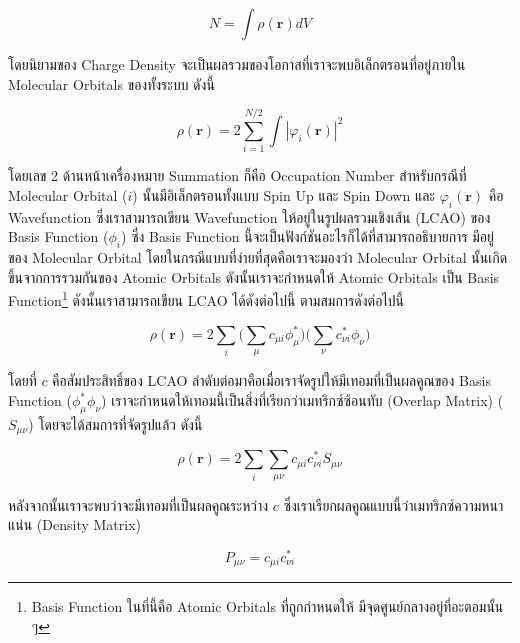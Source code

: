 \begin{equation}
    N = \int \rho (\mathbf{r}) dV
\end{equation}

โดยนิยามของ Charge Density จะเป็นผลรวมของโอกาสที่เราจะพบอิเล็กตรอนที่อยู่ภายใน Molecular Orbitals ของทั้งระบบ ดังนี้

\begin{equation}\label{eq:charge_density}
    \rho (\mathbf{r}) = 2 \sum^{N/2}_{i=1} \int |\varphi_{i}(\mathbf{r})|^{2}
\end{equation}

\noindent โดยเลข 2 ด้านหน้าเครื่องหมาย Summation ก็คือ Occupation Number สำหรับกรณีที่ Molecular Orbital ($i$) 
นั้นมีอิเล็กตรอนทั้งแบบ Spin Up และ Spin Down และ $\varphi_{i}(\mathbf{r})$ คือ Wavefunction ซึ่งเราสามารถเขียน Wavefunction 
ให้อยู่ในรูปผลรวมเชิงเส้น (LCAO) ของ Basis Function ($\phi_{i}$) ซึ่ง Basis Function นี้จะเป็นฟังก์ชันอะไรก็ได้ที่สามารถอธิบายการ%
มีอยู่ของ Molecular Orbital โดยในกรณีแบบที่ง่ายที่สุดคือเราจะมองว่า Molecular Orbital นั้นเกิดขึ้นจากการรวมกันของ Atomic Orbitals 
ดังนั้นเราจะกำหนดให้ Atomic Orbitals เป็น Basis Function\footnote{Basis Function ในที่นี้คือ Atomic Orbitals ที่ถูกกำหนดให้%
มีจุดศูนย์กลางอยู่ที่อะตอมนั้น ๆ} ดังนั้นเราสามารถเขียน LCAO ได้ดังต่อไปนี้ 
ตามสมการดังต่อไปนี้

\begin{equation}
    \rho (\mathbf{r}) = 2 \sum_{i} \big( \sum_{\mu} c_{\mu i} \phi_{\mu}^{*} \big) 
    \big( \sum_{\nu} c^{*}_{\nu i}  \phi_{\nu} \big)
\end{equation}

\noindent โดยที่ $c$ คือสัมประสิทธิ์ของ LCAO ลำดับต่อมาคือเมื่อเราจัดรูปให้มีเทอมที่เป็นผลคูณของ Basis Function ($\phi_{\mu}^{*} 
\phi_{\nu}$) เราจะกำหนดให้เทอมนี้เป็นสิ่งที่เรียกว่าเมทริกซ์ซ้อนทับ (Overlap Matrix) ($S_{\mu\nu}$) โดยจะได้สมการที่จัดรูปแล้ว ดังนี้

\begin{equation}
    \rho (\mathbf{r}) = 2 \sum_{i}\sum_{\mu\nu} c_{\mu i} c^{*}_{\nu i} S_{\mu\nu}
\end{equation}

หลังจากนั้นเราจะพบว่าจะมีเทอมที่เป็นผลคูณระหว่าง $c$ ซึ่งเราเรียกผลคูณแบบนี้ว่าเมทริกซ์ความหนาแน่น (Density Matrix) 

\begin{equation}\label{eq:density_matrix}
    P_{\mu\nu} = c_{\mu i} c^{*}_{\nu i}
\end{equation}

